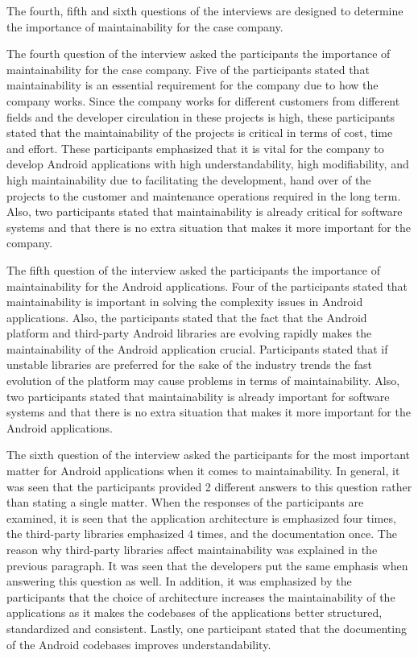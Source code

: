 The fourth, fifth and sixth questions of the interviews are designed to determine the importance of maintainability for the case company.

The fourth question of the interview asked the participants the importance of maintainability for the case company. Five of the participants stated that maintainability is an essential requirement for the company due to how the company works. Since the company works for different customers from different fields and the developer circulation in these projects is high, these participants stated that the maintainability of the projects is critical in terms of cost, time and effort. These participants emphasized that it is vital for the company to develop Android applications with high understandability, high modifiability, and high maintainability due to facilitating the development, hand over of the projects to the customer and maintenance operations required in the long term. Also, two participants stated that maintainability is already critical for software systems and that there is no extra situation that makes it more important for the company.

The fifth question of the interview asked the participants the importance of maintainability for the Android applications. Four of the participants stated that maintainability is important in solving the complexity issues in Android applications. Also, the participants stated that the fact that the Android platform and third-party Android libraries are evolving rapidly makes the maintainability of the Android application crucial. Participants stated  that if unstable libraries are preferred for the sake of the industry trends the fast evolution of the platform may cause problems in terms of maintainability. Also, two participants stated that maintainability is already important for software systems and that there is no extra situation that makes it more important for the Android applications.

The sixth question of the interview asked the participants for the most important matter for Android applications when it comes to maintainability. In general, it was seen that the participants provided 2 different answers to this question rather than stating a single matter. When the responses of the participants are examined, it is seen that the application architecture is emphasized four times, the third-party libraries emphasized 4 times, and the documentation once. The reason why third-party libraries affect maintainability was explained in the previous paragraph. It was seen that the developers put the same emphasis when answering this question as well. In addition, it was emphasized by the participants that the choice of architecture increases the maintainability of the applications as it makes the codebases of the applications better structured, standardized and consistent. Lastly, one participant stated that the documenting of the Android codebases improves understandability.